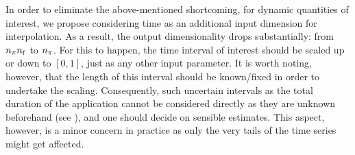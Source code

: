 In order to eliminate the above-mentioned shortcoming, for dynamic quantities of
interest, we propose considering time as an additional input dimension for
interpolation. As a result, the output dimensionality drops substantially: from
${n_\pi}{n_t}$ to ${n_\pi}$. For this to happen, the time interval of interest should be
scaled up or down to $[0, 1]$, just as any other input parameter. It is worth
noting, however, that the length of this interval should be known/fixed in order
to undertake the scaling. Consequently, such uncertain intervals as the total
duration of the application cannot be considered directly as they are unknown
beforehand (see ), and one should decide on sensible
estimates. This aspect, however, is a minor concern in practice as only the very
tails of the time series might get affected.

